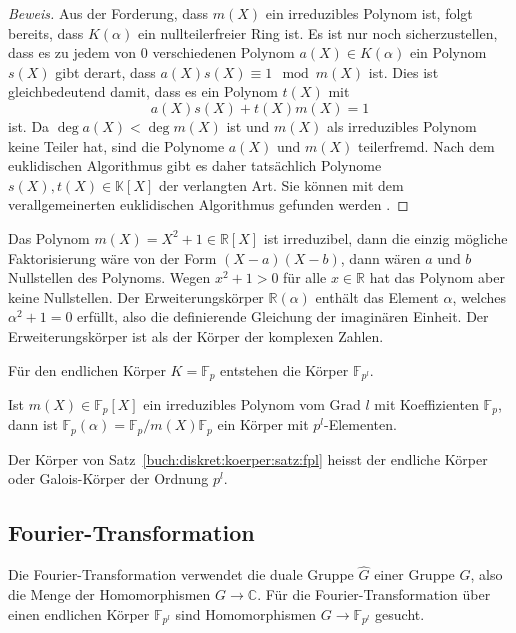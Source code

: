 \begin{proof}[Beweis]
Aus der Forderung, dass $m(X)$ ein irreduzibles Polynom ist, folgt
bereits, dass $K(\alpha)$ ein nullteilerfreier Ring ist.
Es ist nur noch sicherzustellen, dass es zu jedem von $0$ verschiedenen
Polynom $a(X)\in K(\alpha)$ ein Polynom $s(X)$ gibt derart, dass
$a(X)s(X) \equiv 1 \mod m(X)$ ist.
Dies ist gleichbedeutend damit, dass es ein Polynom $t(X)$ mit
\[
a(X)s(X) + t(X) m(X) = 1
\]
ist.
Da $\deg a(X)<\deg m(X)$ ist und $m(X)$ als irreduzibles Polynom
keine Teiler hat, sind die Polynome $a(X)$ und $m(X)$ teilerfremd.
Nach dem euklidischen Algorithmus gibt es daher tatsächlich Polynome 
$s(X),t(X)\in \mathbb{K}[X]$ der verlangten Art.
Sie können mit dem verallgemeinerten euklidischen Algorithmus
gefunden werden \cite{buch:linalg}.
\end{proof}

Das Polynom $m(X)=X^2+1\in\mathbb{R}[X]$ ist irreduzibel, dann die
einzig mögliche Faktorisierung wäre von der Form $(X-a)(X-b)$, dann
wären $a$ und $b$ Nullstellen des Polynoms.
Wegen $x^2+1 >0$ für alle $x\in\mathbb{R}$ hat das Polynom aber keine
Nullstellen.
Der Erweiterungskörper $\mathbb{R}(\alpha)$ enthält das Element $\alpha$,
welches $\alpha^2+1=0$ erfüllt, also die definierende Gleichung der
imaginären Einheit.
Der Erweiterungskörper ist als der Körper der komplexen Zahlen.

Für den endlichen Körper $K=\mathbb{F}_p$ entstehen die Körper
$\mathbb{F}_{p^l}$.

\begin{satz}
\label{buch:diskret:koerper:satz:fpl}
Ist $m(X)\in \mathbb{F}_p[X]$ ein irreduzibles Polynom vom Grad $l$ mit
Koeffizienten $\mathbb{F}_p$, dann ist $\mathbb{F}_{p}(\alpha) = \mathbb{F}_p/m(X)\mathbb{F}_p$ ein Körper mit $p^l$-Elementen.
\end{satz}

\begin{definition}
\label{buch:diskret:koerper:def:fpl}
Der Körper von Satz~\ref{buch:diskret:koerper:satz:fpl} heisst der
endliche Körper oder Galois-Körper der Ordnung $p^l$.
\end{definition}

%
%
\subsection{Fourier-Transformation
\label{buch:diskret:koeper:subsection:fourier}}
Die Fourier-Transformation verwendet die duale Gruppe $\hat{G}$ einer
Gruppe $G$, also die Menge der Homomorphismen $G\to \mathbb{C}$.
Für die Fourier-Transformation über einen endlichen Körper
$\mathbb{F}_{p^l}$ sind Homomorphismen
\(
G \to \mathbb{F}_{p^l}
\)
gesucht.

